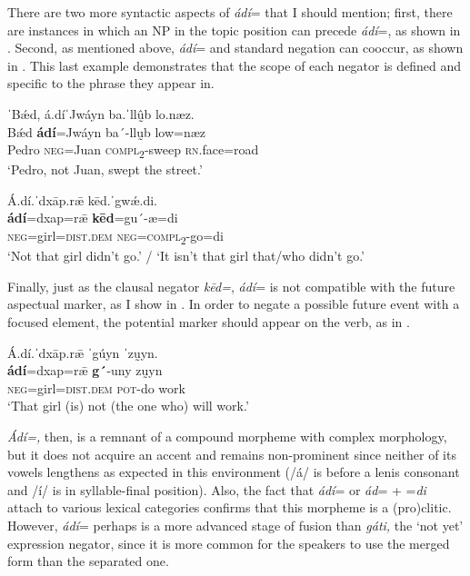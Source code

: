 \documentclass[output=paper,colorlinks=true, citecolor=brown]{langscibook}
\begin{document}
There are two more syntactic aspects of \textit{ádí}= that I should mention; first, there are instances in which an NP in the topic position can precede \textit{ádí}=, as shown in . Second, as mentioned above, \textit{ádí}= and standard negation can cooccur, as shown in . This last example demonstrates that the scope of each negator is defined and specific to the phrase they appear in.


\ea\label{ex:zap:81} 
    \glll ˈBǽd, á.díˈJwáyn ba.ˈllṵ̂b lo.næz.  \\ 
          Bǽd \textbf{ádí}=Jwáyn ba´-llṵb low=næz\\
          Pedro \textsc{neg}=Juan \textsc{compl}\textsc{\textsubscript{2}}{}-sweep \textsc{rn}.face=road\\
    \glt ‘Pedro, not Juan, swept the street.’
\z 

\ea\label{ex:zap:82} 
    \glll Á.dí.ˈdxāp.rǣ kēd.ˈgwǽ.di.\\ 
          \textbf{ádí}=dxap=rǣ \textbf{kēd}=gu´-æ=di\\
          \textsc{neg}=girl=\textsc{dist.dem} \textsc{neg}=\textsc{compl}\textsc{\textsubscript{2}}{}-go=di\\
    \glt ‘Not that girl didn’t go.’ / ‘It isn’t that girl that/who didn’t go.’ 
\z 

Finally, just as the clausal negator \textit{kēd=}, \textit{ádí}= is not compatible with the future aspectual marker, as I show in . In order to negate a possible future event with a focused element, the potential marker should appear on the verb, as in .

\z 

\ea\label{ex:zap:84} 
    \glll Á.dí.ˈdxāp.rǣ ˈgúyn ˈzṵyn. \\ 
          \textbf{ádí}=dxap=rǣ \textbf{g´}{}-uny zṵyn\\
          \textsc{neg}=girl=\textsc{dist.dem} \textsc{pot}{}-do work\\
    \glt ‘That girl (is) not (the one who) will work.’
\z 

\textit{Ádí=,} then, is a remnant of a compound morpheme with complex morphology, but it does not acquire an accent and remains non-prominent since neither of its vowels lengthens as expected in this environment (/á/ is before a lenis consonant and /í/ is in syllable-final position). Also, the fact that \textit{ádí}= or \textit{ád}= + =\textit{di} attach to various lexical categories confirms that this morpheme is a (pro)clitic. However, \textit{ádí}= perhaps is a more advanced stage of fusion than \textit{gáti,} the ‘not yet’ expression negator, since it is more common for the speakers to use the merged form than the separated one. 
\end{document}
